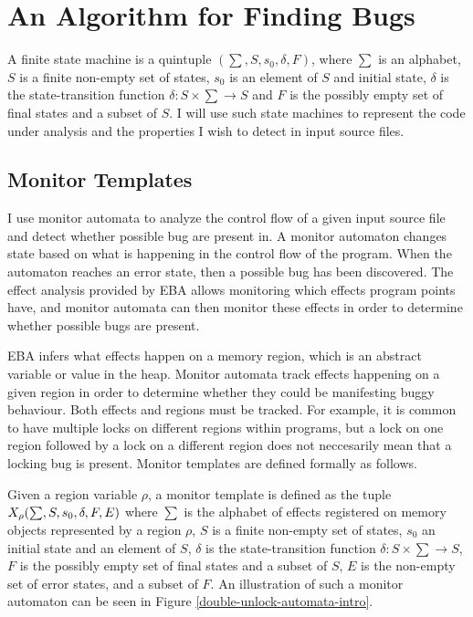 \section{An Algorithm for Finding Bugs}
A finite state machine is a quintuple $(\sum, S, s_0, \delta, F)$, where $\sum$ is an alphabet, $S$ is a finite non-empty set of states, $s_0$ is an element of $S$ and initial state, $\delta$ is the state-transition function $\delta: S \times \sum \rightarrow S$ and $F$ is the possibly empty set of final states and a subset of $S$. I will use such state machines to represent the code under analysis and the properties I wish to detect in input source files. 


\subsection{Monitor Templates}
\label{monitor-template-section}
\noindent I use monitor automata to analyze the control flow of a given input source file and detect whether possible bug are present in. A monitor automaton changes state based on what is happening in the control flow of the program. When the automaton reaches an error state, then a possible bug has been discovered. The effect analysis provided by EBA allows monitoring which effects program points have, and monitor automata can then monitor these effects in order to determine whether possible bugs are present. 

\newpar EBA infers what effects happen on a memory region, which is an abstract variable or value in the heap. Monitor automata track effects happening on a given region in order to determine whether they could be manifesting buggy behaviour. Both effects and regions must be tracked. For example, it is common to have multiple locks on different regions within programs, but a lock on one region followed by a lock on a different region does not neccesarily mean that a locking bug is present. Monitor templates are defined formally as follows. 

\newpar Given a region variable $\rho$, a monitor template is defined as the tuple $X_\rho (\sum, S, s_0, \delta, \\F, E)$ where $\sum$ is the alphabet of effects registered on memory objects represented by a region $\rho$, $S$ is a finite non-empty set of states, $s_0$ an initial state and an element of $S$, $\delta$ is the state-transition function $\delta: S \times \sum \rightarrow S$, $F$ is the possibly empty set of final states and a subset of $S$, $E$ is the non-empty set of error states, and a subset of $F$. An illustration of such a monitor automaton can be seen in Figure \ref{double-unlock-automata-intro}. 

